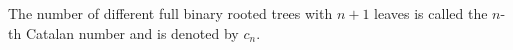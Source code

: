 

\setcounter{section}{4}
\setcounter{subsection}{1}
\setcounter{dfn}{1}

\begin{dfn}
The number of different full binary rooted trees with $n+1$ leaves is called the $n$-th Catalan number and is denoted by $c_n$.
\end{dfn}

